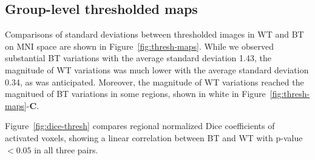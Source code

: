 \documentclass[conference]{IEEEtran}
\begin{document}
\subsection{Group-level thresholded maps}

Comparisons of standard deviations between thresholded images in WT and BT
on MNI space are shown in Figure~\ref{fig:thresh-maps}.
While we observed substantial BT variations with the average standard deviation 1.43,
the magnitude of WT variations was much lower with the average standard deviation 0.34,
as was anticipated. 
Moreover, the magnitude of WT variations reached the magnitued of BT variations
in some regions, shown in white in Figure~\ref{fig:thresh-maps}-\textbf{C}.

Figure~\ref{fig:dice-thresh} compares regional normalized Dice coefficients of
activated voxels, showing a linear correlation between BT and WT with p-value $< 0.05$ in all three pairs.
\end{document}
